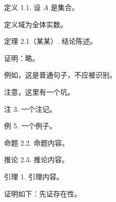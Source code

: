 \documentclass{elegantbook}
\begin{document}
定义 1.1. 设 $A$ 是集合。

定义域为全体实数。

定理 2.1（某某）. 结论陈述。

证明：略。

例如，这是普通句子，不应被识别。

注意，这里有一个坑。

注 3. 一个注记。

例 5. 一个例子。

命题 2.2. 命题内容。

推论 2.3. 推论内容。

引理 1. 引理内容。

证明如下：先证存在性。
\end{document}
